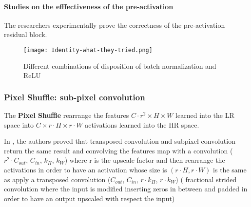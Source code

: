 \paragraph{Studies on the efffectiveness of the pre-activation}
The researchers experimentally prove the correctness of the pre-activation residual block.
\begin{figure}[H]
    \centering
    \texttt{[image: Identity-what-they-tried.png]}
    \caption{Different combinations of disposition of batch normalization and ReLU}
\end{figure}


\subsubsection{Pixel Shuffle: sub-pixel convolution \cite{subpixelconvolution}}

The \textbf{Pixel Shuffle} rearrange the features $C \cdot r^2 \times H \times W$ learned into the LR space into $C \times r \cdot H \times r \cdot W$ activations learned into the HR space.

In \cite{eli5subpixelconvolution}, the authors proved that transposed convolution and subpixel convolution return the same result and convolving the features map with a convolution ($r^2 \cdot C_{out}$, $C_{in}$, $k_H$, $k_W$) where r is the upscale factor and then rearrange the activations in order to have an activation whose size is $(r \cdot H, r \cdot W)$ is the same as apply a transposed convolution ($C_{out}$, $C_{in}$, $r \cdot k_H$, $r \cdot k_W$)  ( fractional strided convolution where the input is modified inserting zeros in between and padded in order to have an output upscaled with respect the input) 